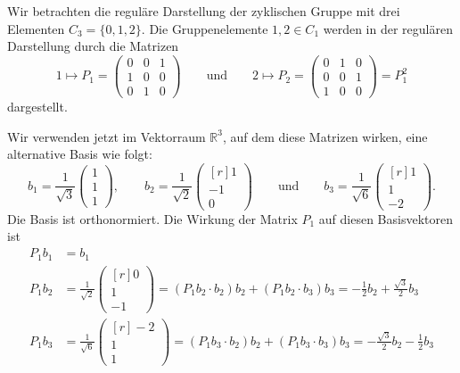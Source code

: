 \begin{beispiel}
\label{buch:gruppen:darstellung:bsp:c3}
Wir betrachten die reguläre Darstellung der zyklischen Gruppe mit
drei Elementen $C_3=\{0,1,2\}$.
Die Gruppenelemente $1,2\in C_1$ werden in der regulären Darstellung
durch die Matrizen
\[
1\mapsto
P_1=
\begin{pmatrix}
0&0&1\\
1&0&0\\
0&1&0
\end{pmatrix}
\qquad\text{und}\qquad
2\mapsto
P_2
=
\begin{pmatrix}
0&1&0\\
0&0&1\\
1&0&0
\end{pmatrix}
=
P_1^2
\]
dargestellt.

Wir verwenden jetzt im Vektorraum $\mathbb{R}^3$, auf dem diese Matrizen
wirken, eine alternative Basis wie folgt:
\[
b_1
=
\frac{1}{\!\sqrt{3}}
\begin{pmatrix}1\\1\\1\end{pmatrix}
,
\qquad
b_2
=
\frac{1}{\!\sqrt{2}}
\begin{pmatrix*}[r]1 \\ -1 \\ 0\end{pmatrix*}
\qquad\text{und}\qquad
b_3
=
\frac{1}{\!\sqrt{6}}
\begin{pmatrix*}[r] 1\\1\\-2\end{pmatrix*}.
\]
Die Basis ist orthonormiert.
Die Wirkung der Matrix $P_1$ auf diesen Basisvektoren ist
\begin{align*}
P_1b_1
&=
b_1\\
P_1b_2
&=
\frac{1}{\!\sqrt{2}}
\begin{pmatrix*}[r]
0\\1\\-1
\end{pmatrix*}
=
(P_1b_2\cdot b_2) b_2
+
(P_1b_2\cdot b_3) b_3
=
-\frac{1}{2}
b_2
+
\frac{\sqrt{3}}{2}
b_3
\\
P_1b_3
&=
\frac{1}{\!\sqrt{6}}
\begin{pmatrix*}[r]
-2\\ 1\\1
\end{pmatrix*}
=
(P_1b_3\cdot b_2) b_2
+
(P_1b_3\cdot b_3) b_3
=
-\frac{\!\sqrt{3}}{2}
b_2
-
\frac{1}{2}
b_3
\end{align*}

\end{beispiel}
